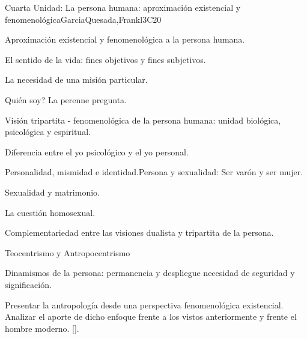 \begin{syllabus}
\begin{unit}{}{Cuarta Unidad: La persona humana: aproximación existencial y fenomenológica}{GarciaQuesada,Frankl}{3}{C20}
\begin{topics}
	\item Aproximación existencial y fenomenológica a la persona humana.
	\item El sentido de la vida: fines objetivos y fines subjetivos.
	\item La necesidad de una misión particular.
	\item Quién soy? La perenne pregunta.
	\item Visión tripartita - fenomenológica de la persona humana: unidad biológica, psicológica y espiritual.
	\item Diferencia entre el yo psicológico y el yo personal.
		\begin{subtopics}
			\item Personalidad, mismidad e identidad.Persona y sexualidad: Ser varón y ser mujer.
			\item Sexualidad y matrimonio.
			\item La cuestión homosexual.
		\end{subtopics}
	\item Complementariedad entre las visiones dualista y tripartita de la persona.
		\begin{subtopics}
			\item Teocentrismo y Antropocentrismo 
		\end{subtopics}
	\item Dinamismos de la persona: permanencia y despliegue  necesidad de seguridad y significación.
\end{topics}
\begin{learningoutcomes}
	\item Presentar la antropología desde una perspectiva fenomenológica existencial. 
Analizar el aporte de dicho enfoque frente a los vistos anteriormente y frente el hombre moderno. [\Usage].
\end{learningoutcomes}
\end{unit}


\end{syllabus}
